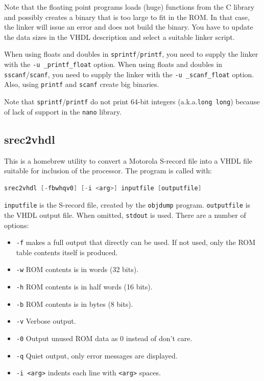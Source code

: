 \documentclass[12pt]{article}
\begin{document}
Note that the floating point programs loads (huge) functions from the C library and possibly creates a binary that is too large to fit in the ROM. In that case, the linker will issue an error and does not build the binary. You have to update the data sizes in the VHDL description and select a suitable linker script.

When using floats and doubles in \lstinline|sprintf|/\lstinline|printf|, you need to supply the linker with the \lstinline|-u _printf_float| option. When using floats and doubles in \lstinline|sscanf|/\lstinline|scanf|, you need to supply the linker with the \lstinline|-u _scanf_float| option. Also, using \lstinline|printf| and \lstinline|scanf| create big binaries.

Note that \lstinline|sprintf|/\lstinline|printf| do not print 64-bit integers (a.k.a.\@ \lstinline|long long|) because of lack of support in the \lstinline|nano| library.

\subsection{srec2vhdl}
This is a homebrew utility to convert a Motorola S-record file into a VHDL file suitable for inclusion of the processor. The program is called with:

\begin{lstlisting}[language=c]
srec2vhdl [-fbwhqv0] [-i <arg>] inputfile [outputfile]
\end{lstlisting}

\lstinline|inputfile| is the S-record file, created by the \lstinline|objdump| program. \lstinline|outputfile| is the VHDL output file. When omitted, \lstinline|stdout| is used. There are a number of options:

\begin{itemize}
\item \lstinline|-f| makes a full output that directly can be used. If not used, only the ROM table contents itself is produced.
\item \lstinline|-w| ROM contents is in words (32 bits).
\item \lstinline|-h| ROM contents is in half words (16 bits).
\item \lstinline|-b| ROM contents is in bytes (8 bits).
\item \lstinline|-v| Verbose output.
\item \lstinline|-0| Output unused ROM data as 0 instead of don't care.
\item \lstinline|-q| Quiet output, only error messages are displayed.
\item \lstinline|-i <arg>| indents each line with \lstinline|<arg>| spaces.
\end{itemize}
\end{document}
